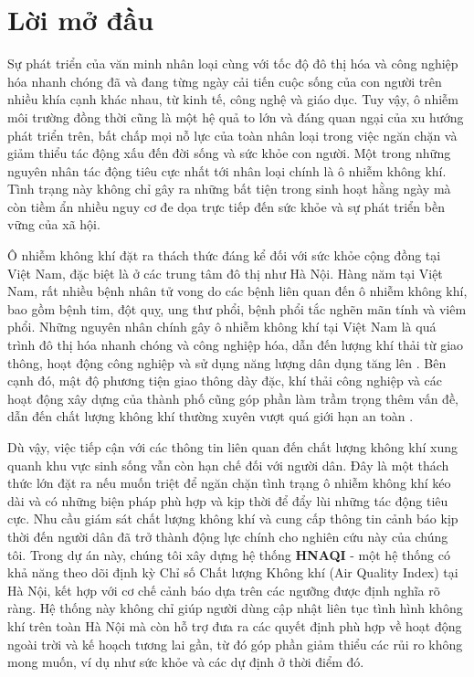 \chapter*{Lời mở đầu}

Sự phát triển của văn minh nhân loại cùng với tốc độ đô thị hóa và công nghiệp hóa nhanh chóng đã và đang từng ngày cải tiến cuộc sống của con người trên nhiều khía cạnh khác nhau, từ kinh tế, công nghệ và giáo dục. Tuy vậy, ô nhiễm môi trường đồng thời cũng là một hệ quả to lớn và đáng quan ngại của xu hướng phát triển trên, bất chấp mọi nỗ lực của toàn nhân loại trong việc ngăn chặn và giảm thiểu tác động xấu đến đời sống và sức khỏe con người. Một trong những nguyên nhân tác động tiêu cực nhất tới nhân loại chính là ô nhiễm không khí. Tình trạng này không chỉ gây ra những bất tiện trong sinh hoạt hằng ngày mà còn tiềm ẩn nhiều nguy cơ đe dọa trực tiếp đến sức khỏe và sự phát triển bền vững của xã hội.

Ô nhiễm không khí đặt ra thách thức đáng kể đối với sức khỏe cộng đồng tại Việt Nam, đặc biệt là ở các trung tâm đô thị như Hà Nội. Hàng năm tại Việt Nam, rất nhiều bệnh nhân tử vong do các bệnh liên quan đến ô nhiễm không khí, bao gồm bệnh tim, đột quỵ, ung thư phổi, bệnh phổi tắc nghẽn mãn tính và viêm phổi. Những nguyên nhân chính gây ô nhiễm không khí tại Việt Nam là quá trình đô thị hóa nhanh chóng và công nghiệp hóa, dẫn đến lượng khí thải từ giao thông, hoạt động công nghiệp và sử dụng năng lượng dân dụng tăng lên \cite{reason}. Bên cạnh đó, mật độ phương tiện giao thông dày đặc, khí thải công nghiệp và các hoạt động xây dựng của thành phố cũng góp phần làm trầm trọng thêm vấn đề, dẫn đến chất lượng không khí thường xuyên vượt quá giới hạn an toàn \cite{HIEN2020134635, Ly_2018}. 

Dù vậy, việc tiếp cận với các thông tin liên quan đến chất lượng không khí xung quanh khu vực sinh sống vẫn còn hạn chế đối với người dân. Đây là một thách thức lớn đặt ra nếu muốn triệt để ngăn chặn tình trạng ô nhiễm không khí kéo dài và có những biện pháp phù hợp và kịp thời để đẩy lùi những tác động tiêu cực. Nhu cầu giám sát chất lượng không khí và cung cấp thông tin cảnh báo kịp thời đến người dân đã trở thành động lực chính cho nghiên cứu này của chúng tôi. Trong dự án này, chúng tôi xây dựng hệ thống \textbf{HNAQI} - một hệ thống có khả năng theo dõi định kỳ Chỉ số Chất lượng Không khí (Air Quality Index) tại Hà Nội, kết hợp với cơ chế cảnh báo dựa trên các ngưỡng được định nghĩa rõ ràng. Hệ thống này không chỉ giúp người dùng cập nhật liên tục tình hình không khí trên toàn Hà Nội mà còn hỗ trợ đưa ra các quyết định phù hợp về hoạt động ngoài trời và kế hoạch tương lai gần, từ đó góp phần giảm thiểu các rủi ro không mong muốn, ví dụ như sức khỏe và các dự định ở thời điểm đó.


